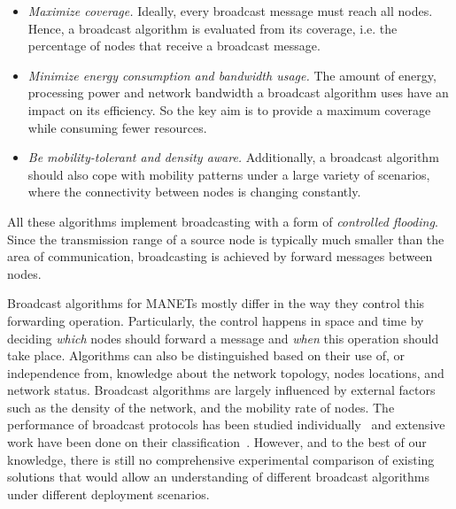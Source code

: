 \begin{itemize}
	\item \textit{Maximize coverage.} Ideally, every broadcast message
    must reach all nodes. Hence, a
    broadcast algorithm is evaluated from its coverage, i.e. the percentage of nodes
    that receive a broadcast message.
	
	\item \textit{Minimize energy consumption and bandwidth usage.} The
    amount of energy, processing power and network bandwidth a
    broadcast algorithm uses have an impact on its efficiency. So the key
    aim is to provide a maximum coverage while consuming fewer resources.
	
	\item \textit{Be mobility-tolerant and density aware.}
	Additionally, a broadcast algorithm should also cope with mobility
  patterns under a large variety of scenarios, where the connectivity
  between nodes is changing constantly.
\end{itemize}

%
All these algorithms implement broadcasting with a form of
\emph{controlled flooding}.
%
Since the transmission range of a source node is typically much
smaller than the area of communication, broadcasting is achieved by
forward messages between nodes.

%
Broadcast algorithms for MANETs mostly differ in the way they control this forwarding operation.
%
Particularly, the control happens in space and time by deciding
\emph{which} nodes should forward a message and \emph{when} this
operation should take place.
%
Algorithms can also be distinguished based on their use of, or independence from, knowledge about the network topology, nodes locations, and network status.
%
Broadcast algorithms are largely influenced by external factors such as the density of the network, and the mobility rate of nodes.
%
The performance of broadcast protocols has been studied individually~\cite{YiGerla2003, Garbinato2010} and extensive work have been done on their classification~\cite{Ruiz2015, Fei1311289}.
%
However, and to the best of our knowledge, there is still no comprehensive experimental comparison of existing solutions that would allow an understanding of different broadcast algorithms under different deployment scenarios.
%

